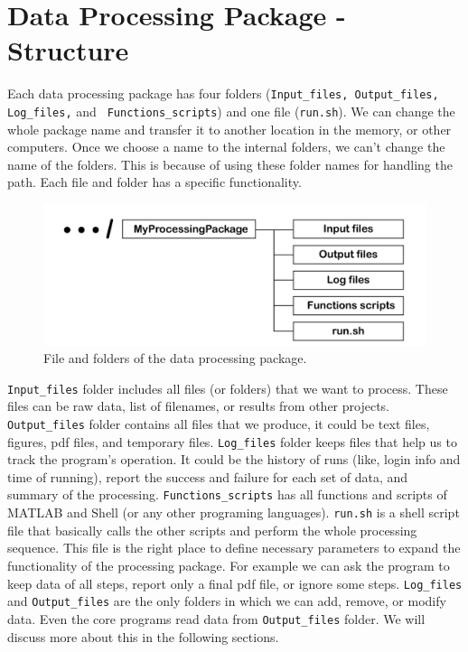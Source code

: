 \section{Data Processing Package - Structure}

Each data processing package has four folders (\texttt{Input\_files, Output\_files, \texttt{Log\_files,}} and \texttt{ Functions\_scripts}) and one file (\texttt{run.sh}). We can change the whole package name and transfer it to another location in the memory, or other computers. Once we choose a name to the internal folders, we can't change the name of the folders. This is because of using these folder names for handling the path. Each file and folder has a specific functionality.

\begin{figure} [ht]
\centering
\includegraphics[scale=0.8]{figures/pdf/Figure02.pdf} 
\caption{File and folders of the data processing package.}
\label{fig:structure}
\end{figure}

\noindent
\texttt{Input\_files} folder includes all files (or folders) that we want to process. These files can be raw data, list of filenames, or results from other projects. \texttt{Output\_files} folder contains all files that we produce, it could be text files, figures, pdf files, and temporary files. \texttt{Log\_files} folder keeps files that help us to track the program's operation. It could be the history of runs (like, login info and time of running), report the success and failure for each set of data, and summary of the processing.  \texttt{Functions\_scripts} has all functions and scripts of MATLAB and Shell (or any other programing languages).  \texttt{run.sh} is a shell script file that basically calls the other scripts and perform the whole processing sequence. This file is the right place to define necessary parameters to expand the functionality of the processing package. For example we can ask the program to keep data of all steps, report only a final pdf file, or ignore some steps.  \texttt{Log\_files} and  \texttt{Output\_files} are the only folders in which we can add, remove, or modify data. Even the core programs read data from  \texttt{Output\_files} folder. We will discuss more about this in the following sections.

